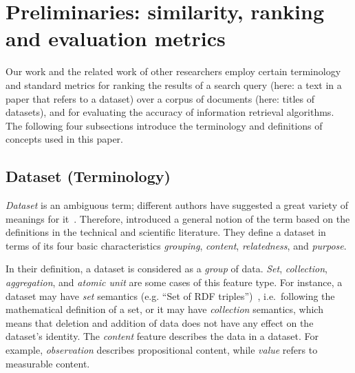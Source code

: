 \documentclass{IOS-Book-Article}
\begin{document}
\section{Preliminaries: similarity, ranking and evaluation metrics}
\label{sec:preliminaries}
Our work and the related work of other researchers employ certain terminology and standard metrics for ranking the results of a search query (here: a text in a paper that refers to a dataset) over a corpus of documents (here: titles of datasets), and for evaluating the accuracy of information retrieval algorithms.
The following four subsections introduce the terminology and definitions of concepts used in this paper.

\subsection{Dataset (Terminology)} 
\emph{Dataset} is an ambiguous term; different authors have suggested a great variety of meanings for it~\cite{peplerpreservation}.
Therefore, \citeauthor{renear2010definitions} introduced a general notion of the term based on the definitions in the technical and scientific literature.
They define a dataset in terms of its four basic characteristics \emph{grouping}, \emph{content}, \emph{relatedness}, and \emph{purpose}.

In their definition, a dataset is considered as a \emph{group} of data.  \emph{Set}, \emph{collection}, \emph{aggregation}, and \emph{atomic unit} are some cases of this feature type.
For instance, a dataset may have \emph{set} semantics (e.g. “Set of RDF triples”)~\cite{renear2010definitions}, i.e.\ following the mathematical definition of a set, or it may have \emph{collection} semantics, which means that deletion and addition of data does not have any effect on the dataset's identity.
The \emph{content} feature describes the data in a dataset.
For example, \emph{observation} describes propositional content, while \emph{value} refers to measurable content.
\end{document}
